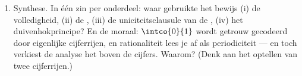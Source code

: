 \begin{problem}
\begin{enumerate}[resume]
        eindige binaire rij ooit gelijk zal zijn aan $\frac{1}{10}$ ---
        de reden waarom $0.1 + 0.2$ in de drijvendekommarekening van een
        computer niet exact $0.3$ is.
  \item Synthese. In één zin per onderdeel: waar gebruikte het bewijs
        (i) de volledigheid, (ii) de , (iii) de
        uniciteitsclausule van de , (iv) het duivenhokprincipe? En
        de moraal: $\intco{0}{1}$ wordt getrouw gecodeerd door
        eigenlijke cijferrijen, en rationaliteit lees je af als
        periodiciteit --- en toch verkiest de analyse het  boven
        de cijfers. Waarom? (Denk aan het optellen van twee
        cijferrijen.)
\end{enumerate}
\end{problem}
